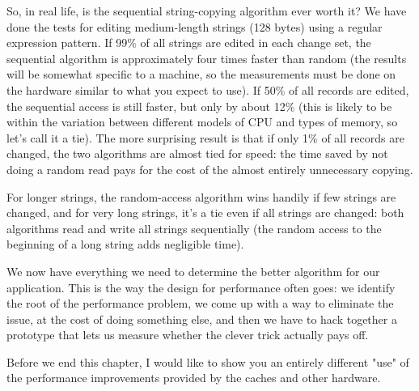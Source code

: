 So, in real life, is the sequential string-copying algorithm ever worth it? We have done the tests for editing medium-length strings (128 bytes) using a regular expression pattern. If 99\% of all strings are edited in each change set, the sequential algorithm is approximately four times faster than random (the results will be somewhat specific to a machine, so the measurements must be done on the hardware similar to what you expect to use). If 50\% of all records are edited, the sequential access is still faster, but only by about 12\% (this is likely to be within the variation between different models of CPU and types of memory, so let's call it a tie). The more surprising result is that if only 1\% of all records are changed, the two algorithms are almost tied for speed: the time saved by not doing a random read pays for the cost of the almost entirely unnecessary copying.

For longer strings, the random-access algorithm wins handily if few strings are changed, and for very long strings, it's a tie even if all strings are changed: both algorithms read and write all strings sequentially (the random access to the beginning of a long string adds negligible time).

We now have everything we need to determine the better algorithm for our application. This is the way the design for performance often goes: we identify the root of the performance problem, we come up with a way to eliminate the issue, at the cost of doing something else, and then we have to hack together a prototype that lets us measure whether the clever trick actually pays off.

Before we end this chapter, I would like to show you an entirely different "use" of the performance improvements provided by the caches and other hardware.




























